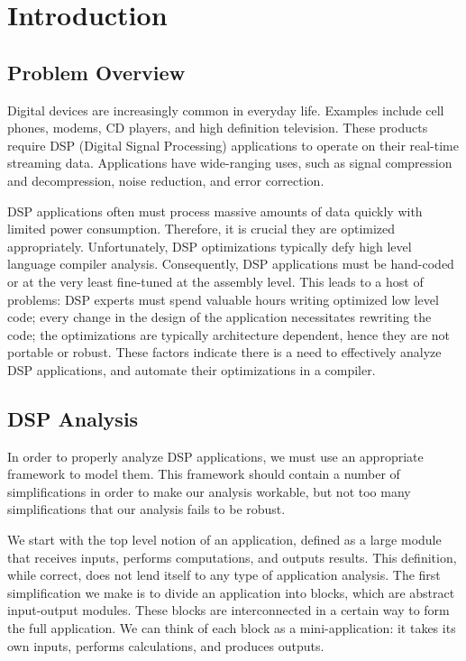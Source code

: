 \section{Introduction}

\subsection{Problem Overview}

    Digital devices are increasingly common in everyday
life. Examples include cell phones, modems, CD players, and high
definition television. These products require DSP (Digital Signal
Processing) applications to operate on their real-time streaming
data. Applications have wide-ranging uses, such as signal
compression and decompression, noise reduction, and error
correction.

    DSP applications often must process massive amounts of data
quickly with limited power consumption. Therefore, it is crucial
they are optimized appropriately. Unfortunately, DSP optimizations
typically defy high level language compiler analysis.
Consequently, DSP applications must be hand-coded or at the very
least fine-tuned at the assembly level. This leads to a host of
problems: DSP experts must spend valuable hours writing optimized
low level code; every change in the design of the application
necessitates rewriting the code; the optimizations are typically
architecture dependent, hence they are not portable or robust.
These factors indicate there is a need to effectively analyze DSP
applications, and automate their optimizations in a compiler.

\subsection{DSP Analysis}

    In order to properly analyze DSP applications, we must use an
appropriate framework to model them.  This framework should
contain a number of simplifications in order to make our analysis
workable, but not too many simplifications that our analysis fails
to be robust.

    We start with the top level notion of an
application, defined as a large module that receives inputs,
performs computations, and outputs results.  This definition,
while correct, does not lend itself to any type of application
analysis. The first simplification we make is to divide an
application into blocks, which are abstract input-output modules.
These blocks are interconnected in a certain way to form the full
application. We can think of each block as a mini-application: it
takes its own inputs, performs calculations, and produces outputs.

